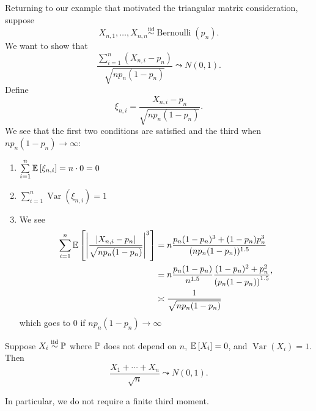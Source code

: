 \begin{example}
	Returning to our example that motivated the triangular matrix consideration, suppose \[
		X_{n,1},\ldots,X_{n,n} \overset{\text{iid}}{\sim} \operatorname{Bernoulli}(p_n)
	.\] We want to show that \[
		\frac{\sum\limits_{i=1}^{n} \left( X_{n,i} - p_n \right)}{\sqrt{n p_n (1-p_n)} } \leadsto N(0,1)
	.\] 
	Define \[
		\xi_{n,i} = \frac{X_{n,i} - p_n}{\sqrt{n p_n (1-p_n)}}
	.\] We see that the first two conditions are satisfied and the third when $np_n (1-p_n) \to \infty$:
	\begin{enumerate}[label=(\roman*)]
			\item $\sum\limits_{i=1}^{n} \E\left[\xi_{n,i}\right] = n \cdot 0 = 0 $
			\item $\sum\limits_{i=1}^{n} \operatorname{Var}\left(\xi_{n,i}\right) = 1$
			\item We see \[
				\begin{aligned}
					\sum\limits_{i=1}^{n} \E\left[\left| \frac{\left| X_{n,i} - p_n \right|}{\sqrt{n p_n (1-p_n)} } \right|^3\right]
					&= n \frac{p_n(1-p_n)^3 + (1-p_n) p_n^3}{(np_n(1-p_n))^{1.5}} \\
					&= n \frac{p_n(1-p_n)}{n^{1.5}} \frac{(1-p_n)^2 + p_n^2}{\left( p_n(1-p_n) \right)^{1.5}} \\
					&\asymp \frac{1}{\sqrt{np_n(1-p_n)} }
				\end{aligned}
			,\] 
			which goes to $0$ if $np_n (1-p_n) \to \infty$
	\end{enumerate}
\end{example}

\begin{corollary}
	Suppose $X_i \overset{\text{iid}}{\sim} \P$ where $\P$ does not depend on $n$, $\E\left[X_i\right]  = 0$, and $\operatorname{Var}\left(X_i\right) = 1$. Then \[
		\frac{X_1+\cdots+X_n}{\sqrt{n}} \leadsto N(0,1)
	.\] 

	In particular, we do not require a finite third moment.
\end{corollary}

